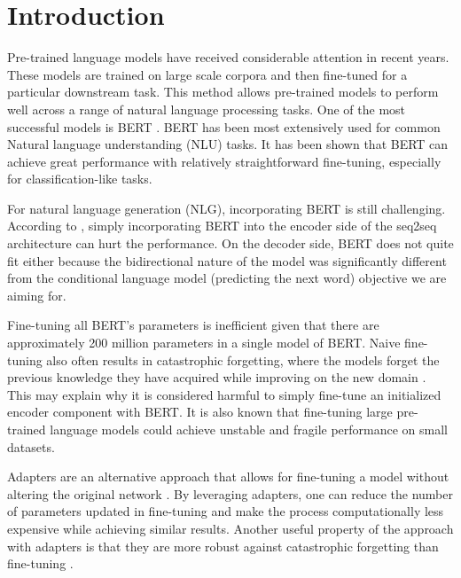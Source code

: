 \chapter*{Introduction}
Pre-trained language models \cite{devlin2018bert,howard2018universal} have received considerable attention in recent years. These models are trained on large scale corpora and then fine-tuned for a particular downstream task. This method allows pre-trained models to perform well across a range of natural language processing tasks. One of the most successful models is BERT \cite{devlin2018bert}. BERT has been most extensively used for common Natural language understanding (NLU) tasks. It has been shown that BERT can achieve great performance with relatively straightforward fine-tuning, especially for classification-like tasks.

For natural language generation (NLG), incorporating BERT is still challenging. According to \citet{zhu2020incorporating}, simply incorporating BERT into the encoder side of the seq2seq architecture can hurt the performance. On the decoder side, BERT does not quite fit either because the bidirectional nature of the model was significantly different from the conditional language model (predicting the next word) objective we are aiming for.

Fine-tuning all BERT's parameters is inefficient given that there are approximately 200 million parameters in a single model of BERT. Naive fine-tuning also often results in catastrophic forgetting, where the models forget the previous knowledge they have acquired while improving on the new domain \cite{mccloskey1989catastrophic,yogatama2019learning}. This may explain why it is considered harmful to simply fine-tune an initialized encoder component with BERT. It is also known that fine-tuning large pre-trained language models could achieve unstable and fragile performance on small datasets.

Adapters are an alternative approach that allows for fine-tuning a model without altering the original network \cite{houlsby2019parameter,bapna2019simple}. By leveraging adapters, one can reduce the number of parameters updated in fine-tuning and make the process computationally less expensive while achieving similar results. Another useful property of the approach with adapters is that they are more robust against catastrophic forgetting than fine-tuning \cite{han2021robust}.

